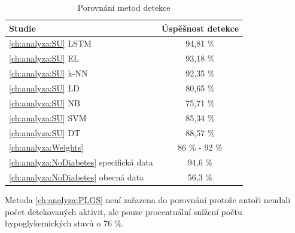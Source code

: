 \begin{table}[H]
\caption{Porovnání metod detekce}
\label{tab:analyzaPA:res}
\centering
\begin{tabular}{|l|c|}
\hline 
\textbf{Studie} & \textbf{Úspěšnost detekce}\tabularnewline
\hline 
\hline 
\ref{ch:analyza:SU} \citet{analyzaPA.SU} LSTM & 94,81 \% \tabularnewline
\hline
\ref{ch:analyza:SU} \citet{analyzaPA.SU} EL & 93,18 \% \tabularnewline
\hline
\ref{ch:analyza:SU} \citet{analyzaPA.SU} k-NN & 92,35 \% \tabularnewline
\hline
\ref{ch:analyza:SU} \citet{analyzaPA.SU} LD & 80,65 \% \tabularnewline
\hline
\ref{ch:analyza:SU} \citet{analyzaPA.SU} NB & 75,71 \% \tabularnewline
\hline
\ref{ch:analyza:SU} \citet{analyzaPA.SU} SVM & 85,34 \% \tabularnewline
\hline
\ref{ch:analyza:SU} \citet{analyzaPA.SU} DT & 88,57 \% \tabularnewline
\hline 
\ref{ch:analyza:Weights} \citet{analyzaPA.Weights} & 86 \% - 92 \% \tabularnewline
\hline 
\ref{ch:analyza:NoDiabetes} \citet{analyzaPA.NoDiabetes} specifická data & 94,6 \% \tabularnewline
\hline
\ref{ch:analyza:NoDiabetes} \citet{analyzaPA.NoDiabetes} obecná data & 56,3 \% \tabularnewline
\hline 
\end{tabular}

\begin{flushleft}
Metoda \ref{ch:analyza:PLGS} \citet{analyzaPA.PLGS} není zařazena do porovnání protože autoři neudali počet detekovaných aktivit, ale pouze procentuální snížení počtu hypoglykemických stavů o 76 \%.
\end{flushleft}
\end{table}


